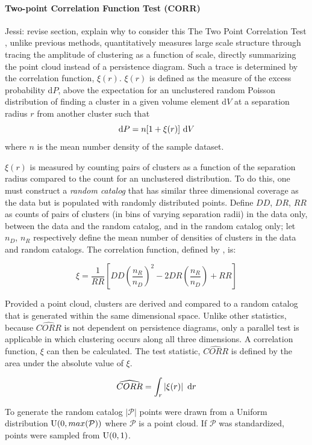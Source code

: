 \documentclass[12pt]{article}
\begin{document}
\paragraph{Two-point Correlation Function Test (CORR)}
{\color{red}  Jessi:  revise section, explain why to consider this}
The Two Point Correlation Test \cite{landy1993bias}, unlike previous methods, quantitatively measures large scale structure through tracing the amplitude of clustering as a function of scale, directly summarizing the point cloud instead of a persistence diagram. Such a trace is determined by the correlation function, $\xi(r)$. $\xi(r)$ is defined as the measure of the excess probability d$P$, above the expectation for an unclustered random Poisson distribution of finding a cluster in a given volume element d$V$ at a separation radius $r$ from another cluster such that 
\[ \textup{d}P = n[1 + \xi(r)] \textup{ d}V \] where $n$ is the mean number density of the sample dataset.

$\xi(r)$ is measured by counting pairs of clusters as a function of the separation radius compared to the count for an unclustered distribution. To do this, one must construct a \textit{random catalog} that has similar three dimensional coverage as the data but is populated with randomly distributed points. Define $DD$, $DR$, $RR$ as counts of pairs of clusters (in bins of varying separation radii) in the data only, between the data and the random catalog, and in the random catalog only; let $n_{D}$, $n_{R}$ respectively define the mean number of densities of clusters in the data and random catalogs. The correlation function, defined by \cite{landy1993bias}, is:

\[ \xi = \frac{1}{RR}\left[DD\left(\frac{n_{R}}{n_{D}}\right)^{2} - 2DR\left(\frac{n_{R}}{n_{D}}\right) + RR\right] \]

Provided a point cloud, clusters are derived and compared to a random catalog that is generated within the same dimensional space. Unlike other statistics, because $\widehat{CORR}$ is not dependent on persistence diagrams, only a parallel test is applicable in which clustering occurs along all three dimensions. A correlation function, $\xi$ can then be calculated. The test statistic, $\widehat{CORR}$ is defined by the area under the absolute value of $\xi$.

\[ \widehat{CORR} = \int_{r} \left | \xi(r) \right | \textup{ d}r \]

To generate the random catalog $\left | \mathcal P \right |$ points were drawn from a Uniform distribution $\textup{U}(0, max(\mathcal P))$ where $\mathcal P$ is a point cloud. If $\mathcal P$ was standardized, points were sampled from $\textup{U}(0, 1)$. 
\end{document}
